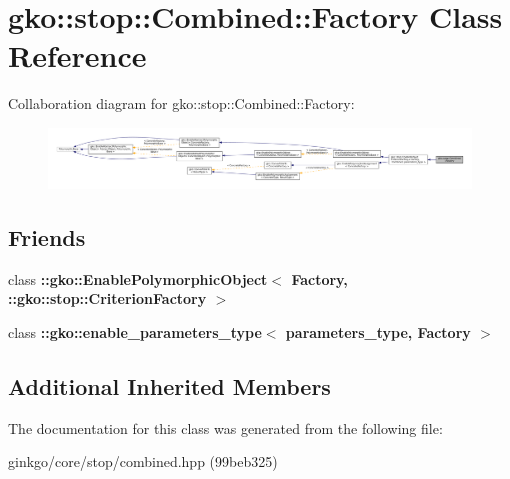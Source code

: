 \hypertarget{classgko_1_1stop_1_1Combined_1_1Factory}{}\section{gko\+:\+:stop\+:\+:Combined\+:\+:Factory Class Reference}
\label{classgko_1_1stop_1_1Combined_1_1Factory}


Collaboration diagram for gko\+:\+:stop\+:\+:Combined\+:\+:Factory\+:
\nopagebreak
\begin{figure}[H]
\begin{center}
\leavevmode
\includegraphics[width=350pt]{classgko_1_1stop_1_1Combined_1_1Factory__coll__graph}
\end{center}
\end{figure}
\subsection*{Friends}
\begin{DoxyCompactItemize}
\item 
\mbox{\label{classgko_1_1stop_1_1Combined_1_1Factory_aaa5507cf00e5361a77971746fefa42e6}} 
class {\bfseries \+::gko\+::\+Enable\+Polymorphic\+Object$<$ Factory, \+::gko\+::stop\+::\+Criterion\+Factory $>$}
\item 
\mbox{\label{classgko_1_1stop_1_1Combined_1_1Factory_a0d176cbd42d6214e11aee8c30ca256fc}} 
class {\bfseries \+::gko\+::enable\+\_\+parameters\+\_\+type$<$ parameters\+\_\+type, Factory $>$}
\end{DoxyCompactItemize}
\subsection*{Additional Inherited Members}


The documentation for this class was generated from the following file\+:\begin{DoxyCompactItemize}
\item 
ginkgo/core/stop/combined.\+hpp (99beb325)\end{DoxyCompactItemize}
